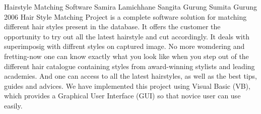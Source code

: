  \begin{conf-abstract}[]
 {Hairstyle Matching Software}
{
Samira Lamichhane 
Sangita Gurung
Sumita Gurung
}
{2006}
            Hair Style Matching Project is a complete software solution for matching different hair styles present in
the database. It offers the customer the opportunity to try out all the latest hairstyle and cut accordingly. It deals
with superimposig with diffrent styles on captured image. No more womdering and fretting-now one can know exactly what 
you look like when you step out of the different hair catalogue containing styles from award-winning stylists and leading 
academies. And one can access to all the latest hairstyles, as well as the best tips, guides and advices. We have 
implemented this project using Visual Basic (VB), which provides a Graphical User Interface (GUI) so that novice user can
use easily.  
  \end{conf-abstract}